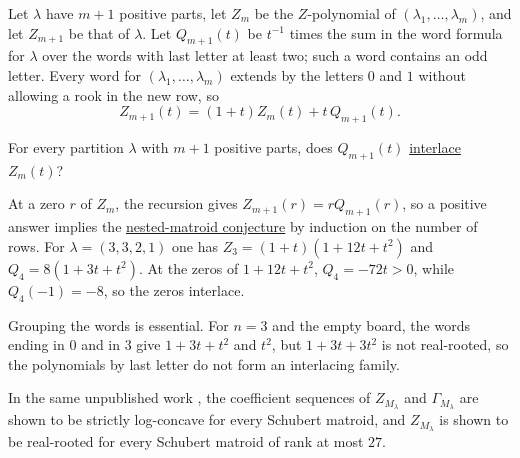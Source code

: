 Let $\lambda$ have $m+1$ positive parts, let $Z_m$ be the $Z$-polynomial of
$(\lambda_1,\dotsc,\lambda_m)$, and let $Z_{m+1}$ be that of $\lambda$.  Let
$Q_{m+1}(t)$ be $t^{-1}$ times the sum in the word formula for $\lambda$ over
the words with last letter at least two; such a word contains an odd letter.
Every word for $(\lambda_1,\dotsc,\lambda_m)$ extends by the letters $0$ and
$1$ without allowing a rook in the new row, so
\[
  Z_{m+1}(t)=(1+t)Z_m(t)+t\,Q_{m+1}(t).
\]

\begin{question}[Alexandersson, 2026]\label{schubertMatroidZRowInterlacing}
For every partition $\lambda$ with $m+1$ positive parts, does $Q_{m+1}(t)$
\hyperref[interlacingPolynomials]{interlace} $Z_m(t)$?
\end{question}

At a zero $r$ of $Z_m$, the recursion gives $Z_{m+1}(r)=rQ_{m+1}(r)$, so a
positive answer implies the
\hyperref[conjNestedMatroidZ]{nested-matroid conjecture} by induction on the
number of rows.  For $\lambda=(3,3,2,1)$ one has $Z_3=(1+t)(1+12t+t^2)$ and
$Q_4=8(1+3t+t^2)$.  At the zeros of $1+12t+t^2$, $Q_4=-72t>0$, while
$Q_4(-1)=-8$, so the zeros interlace.

Grouping the words is essential.  For $n=3$ and the empty board, the words
ending in $0$ and in $3$ give $1+3t+t^2$ and $t^2$, but $1+3t+3t^2$ is not
real-rooted, so the polynomials by last letter do not form an interlacing
family.

In the same unpublished work \cite{Alexandersson2026SchubertMatroidZ}, the
coefficient sequences of $Z_{M_\lambda}$ and $\Gamma_{M_\lambda}$ are shown to
be strictly log-concave for every Schubert matroid, and $Z_{M_\lambda}$ is
shown to be real-rooted for every Schubert matroid of rank at most $27$.
